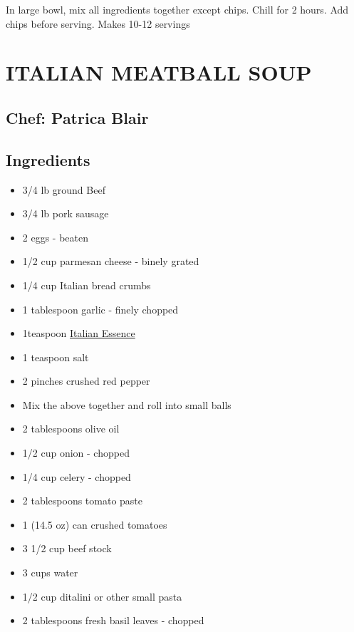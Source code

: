 \documentclass[
]{book}
\providecommand{\tightlist}{%
  \setlength{\itemsep}{0pt}\setlength{\parskip}{0pt}}
\begin{document}
In large bowl, mix all ingredients together except chips.
Chill for 2 hours. Add chips before serving. Makes 10-12 servings

\hypertarget{italian-meatball-soup}{%
\section*{ITALIAN MEATBALL SOUP}\label{italian-meatball-soup}}


\hypertarget{chef-patrica-blair}{%
\subsection*{Chef: Patrica Blair}\label{chef-patrica-blair}}


\hypertarget{ingredients-19}{%
\subsection*{Ingredients}\label{ingredients-19}}


\begin{itemize}
\tightlist
\item
  3/4 lb ground Beef
\item
  3/4 lb pork sausage
\item
  2 eggs - beaten
\item
  1/2 cup parmesan cheese - binely grated
\item
  1/4 cup Italian bread crumbs
\item
  1 tablespoon garlic - finely chopped
\item
  1teaspoon \href{https://www.emerils.com/121962/italian-essence}{Italian Essence}
\item
  1 teaspoon salt
\item
  2 pinches crushed red pepper
\item
  Mix the above together and roll into small balls
\item
  2 tablespoons olive oil
\item
  1/2 cup onion - chopped
\item
  1/4 cup celery - chopped
\item
  2 tablespoons tomato paste
\item
  1 (14.5 oz) can crushed tomatoes
\item
  3 1/2 cup beef stock
\item
  3 cups water
\item
  1/2 cup ditalini or other small pasta
\item
  2 tablespoons fresh basil leaves - chopped
\end{itemize}
\end{document}
